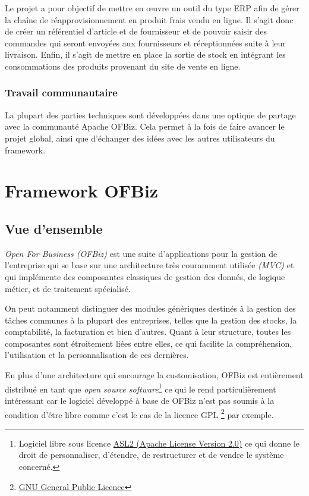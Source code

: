 Le projet a pour objectif de mettre en œuvre un outil du type ERP afin de gérer la chaîne de réapprovisionnement en produit frais vendu en ligne. Il s’agit donc de créer un référentiel d’article et de fournisseur et de pouvoir saisir des commandes qui seront envoyées aux fournisseurs et réceptionnées suite à leur livraison. Enfin, il s’agit de mettre en place la sortie de stock en intégrant les consommations des produits provenant du site de vente en ligne.

\subsubsection{Travail communautaire}
La plupart des parties techniques sont développées dans une optique de partage avec la communauté Apache OFBiz. Cela permet à la fois de faire avancer le projet global, ainsi que d'échanger des idées avec les autres utilisateurs du framework.  







\section{Framework OFBiz}
\subsection{Vue d'ensemble }
\emph{Open For Business (OFBiz)} est une suite d'applications pour la gestion de l'entreprise qui se base sur une architecture très couramment utilisée \emph{(MVC)} et qui implémente des composantes classiques de gestion des donnés, de logique métier, et de traitement spécialisé. 

On peut notamment distinguer des modules génériques destinés à la gestion des tâches communes à la plupart des entreprises, telles que la gestion des stocks, la comptabilité, la facturation et bien d'autres. Quant à leur structure, toutes les composantes sont étroitement liées entre elles, ce qui facilite la compréhension, l'utilisation et la personnalisation de ces dernières. 


En plus d'une architecture qui encourage la customisation, OFBiz est entièrement distribué en tant que \emph{open source software}\footnote{Logiciel libre sous licence \href{https://www.apache.org/licenses/LICENSE-2.0.html}{ASL2 (Apache License Version 2.0)} ce qui donne le droit de personnaliser, d'étendre, de restructurer et de vendre le système concerné. } ce qui le rend particulièrement intéressant car le logiciel développé à base de OFBiz n'est pas soumis à la condition d'être libre comme c'est le cas de la licence GPL  \footnote{\href{http://www.gnu.org/licenses/gpl-3.0.html}{GNU General Public Licence}} par exemple.

